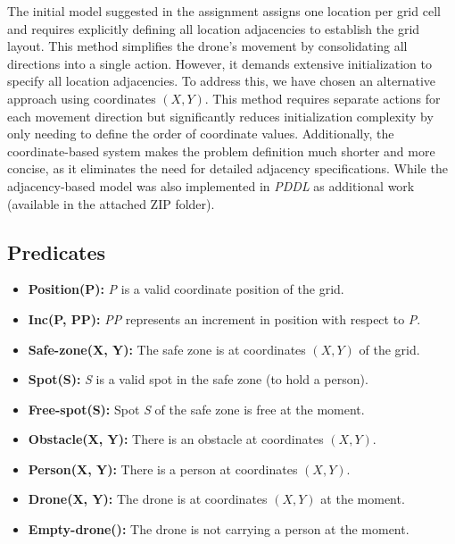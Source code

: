 \documentclass{article}
\begin{document}
\vspace{1em}

\begin{tcolorbox}[colback=gray!10, colframe=black, title=Adjacency vs. Coordinates system]
    The initial model suggested in the assignment assigns one location per grid cell and requires explicitly defining all location adjacencies to establish the grid layout. This method simplifies the drone's movement by consolidating all directions into a single action. However, it demands extensive initialization to specify all location adjacencies. To address this, we have chosen an alternative approach using coordinates \((X, Y)\). This method requires separate actions for each movement direction but significantly reduces initialization complexity by only needing to define the order of coordinate values. Additionally, the coordinate-based system makes the problem definition much shorter and more concise, as it eliminates the need for detailed adjacency specifications. While the adjacency-based model was also implemented in \textit{PDDL} as additional work (available in the attached ZIP folder).
\end{tcolorbox}

\subsection{Predicates}

\begin{itemize}[label=--, itemsep=0.05em]
    \item \textbf{Position(P):} \textit{P} is a valid coordinate position of the grid.
    \item \textbf{Inc(P, PP):} \textit{PP} represents an increment in position with respect to \textit{P}.
    \item \textbf{Safe-zone(X, Y):} The safe zone is at coordinates \((X, Y)\) of the grid.
    \item \textbf{Spot(S):} \textit{S} is a valid spot in the safe zone (to hold a person).
    \item \textbf{Free-spot(S):} Spot \textit{S} of the safe zone is free at the moment.
    \item \textbf{Obstacle(X, Y):} There is an obstacle at coordinates \((X, Y)\).
    \item \textbf{Person(X, Y):} There is a person at coordinates \((X, Y)\).
    \item \textbf{Drone(X, Y):} The drone is at coordinates \((X, Y)\) at the moment.
    \item \textbf{Empty-drone():} The drone is not carrying a person at the moment.
\end{itemize}
\end{document}
